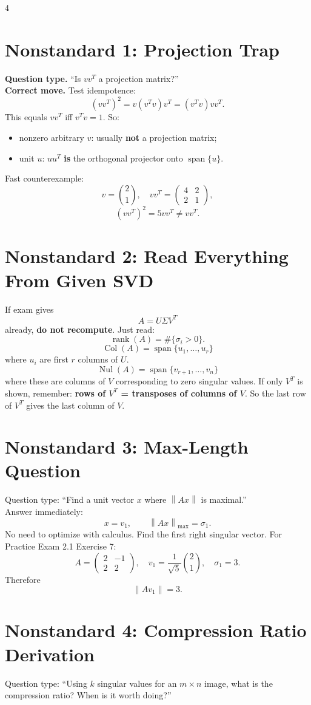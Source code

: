 \documentclass[letterpaper]{article}
\newcommand{\Span}{\operatorname{span}}
\newcommand{\Col}{\operatorname{Col}}
\newcommand{\Nul}{\operatorname{Nul}}
\newcommand{\Rank}{\operatorname{rank}}
\newcommand{\norm}[1]{\left\lVert #1\right\rVert}
\newcommand{\smallhead}[1]{{\bfseries #1}}
\begin{document}
\begin{multicols*}{4}
\section{Nonstandard 1: Projection Trap}
\smallhead{Question type.} ``Is $vv^T$ a projection matrix?''\\
\smallhead{Correct move.} Test idempotence:
\[
(vv^T)^2=v(v^Tv)v^T=(v^Tv)vv^T.
\]
This equals $vv^T$ iff $v^Tv=1$. So:
\begin{itemize}
\item nonzero arbitrary $v$: usually \textbf{not} a projection matrix;
\item unit $u$: $uu^T$ \textbf{is} the orthogonal projector onto $\Span\{u\}$.
\end{itemize}
Fast counterexample:
\[
v=\binom21,\quad vv^T=\begin{pmatrix}4&2\\2&1\end{pmatrix},
\]
\[
(vv^T)^2=5vv^T\neq vv^T.
\]

\section{Nonstandard 2: Read Everything From Given SVD}
If exam gives
\[
A=U\Sigma V^T
\]
already, \textbf{do not recompute}. Just read:
\[
\Rank(A)=\#\{\sigma_i>0\}.
\]
\[
\Col(A)=\Span\{u_1,\dots,u_r\}
\]
where $u_i$ are first $r$ columns of $U$.
\[
\Nul(A)=\Span\{v_{r+1},\dots,v_n\}
\]
where these are columns of $V$ corresponding to zero singular values.
If only $V^T$ is shown, remember: \textbf{rows of $V^T$ = transposes of columns of $V$}. So the last row of $V^T$ gives the last column of $V$.

\section{Nonstandard 3: Max-Length Question}
Question type: ``Find a unit vector $x$ where $\norm{Ax}$ is maximal.''\\
Answer immediately:
\[
x=v_1,\qquad \norm{Ax}_{\max}=\sigma_1.
\]
No need to optimize with calculus. Find the first right singular vector.
For Practice Exam 2.1 Exercise 7:
\[
A=\begin{pmatrix}2&-1\\2&2\end{pmatrix},
\quad
v_1=\frac{1}{\sqrt5}\binom21,\quad
\sigma_1=3.
\]
Therefore
\[
\norm{Av_1}=3.
\]

\section{Nonstandard 4: Compression Ratio Derivation}
Question type: ``Using $k$ singular values for an $m\times n$ image, what is the compression ratio? When is it worth doing?''


\end{multicols*}
\end{document}
